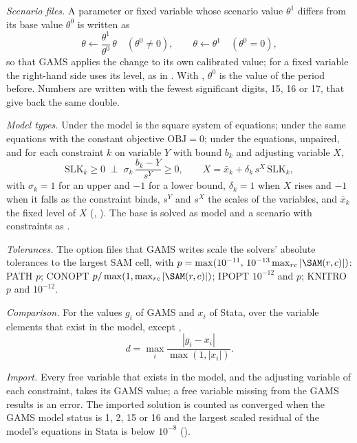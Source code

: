 
\textit{Scenario files.} A parameter or fixed variable whose scenario value
$\theta^1$ differs from its base value $\theta^0$ is written as
\begin{equation*}
\theta \leftarrow \frac{\theta^1}{\theta^0}\,\theta \quad (\theta^0 \ne 0),
\qquad \theta \leftarrow \theta^1 \quad (\theta^0 = 0),
\end{equation*}
so that GAMS applies the change to its own calibrated value; for a fixed
variable the right-hand side uses its level, as in
. With , $\theta^0$
is the value of the period before. Numbers are written with the fewest
significant digits, 15, 16 or 17, that give back the same double.

\textit{Model types.} Under  the model is the square system of
equations; under  the same equations with the constant objective
$\text{OBJ} = 0$; under  the equations, unpaired, and for each
constraint $k$ on variable $Y$ with bound $b_k$ and adjusting variable $X$,
\begin{equation*}
\text{SLK}_k \ge 0 \;\perp\; \sigma_k\,\frac{b_k - Y}{s^Y} \ge 0, \qquad
X = \bar x_k + \delta_k\,s^X\,\text{SLK}_k,
\end{equation*}
with $\sigma_k = 1$ for an upper and $-1$ for a lower bound, $\delta_k = 1$
when $X$ rises and $-1$ when it falls as the constraint binds, $s^Y$ and
$s^X$ the scales of the variables, and $\bar x_k$ the fixed level of $X$
(, ). The base is solved as model
 and a scenario with constraints as .

\textit{Tolerances.} The option files that GAMS writes scale the solvers'
absolute tolerances to the largest SAM cell, with
$p = \max(10^{-11},\, 10^{-13}\max_{rc} |\SAM(r,c)|)$: PATH
 $p$; CONOPT  $p / \max(1, \max_{rc}
|\SAM(r,c)|)$; IPOPT  $10^{-12}$ and  $p$;
KNITRO  $p$ and  $10^{-12}$.

\textit{Comparison.} For the values $g_i$ of GAMS and $x_i$ of Stata, over
the variable elements that exist in the model, except ,
\begin{equation*}
d = \max_i \frac{|g_i - x_i|}{\max(1, |x_i|)} .
\end{equation*}

\textit{Import.} Every free variable that exists in the model, and the
adjusting variable of each constraint, takes its GAMS value; a free variable
missing from the GAMS results is an error. The imported solution is counted
as converged when the GAMS model status is 1, 2, 15 or 16 and the largest
scaled residual of the model's equations in Stata is below $10^{-8}$
().

